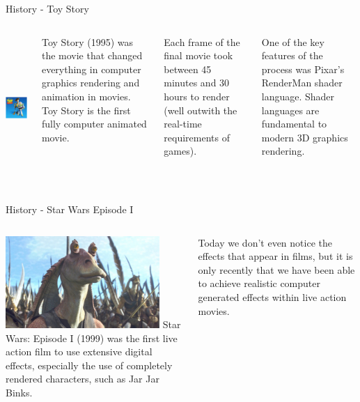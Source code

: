 \documentclass[handout,18pt]{beamer}
\begin{document}
\begin{frame}{History - Toy Story}
\begin{columns}
\includegraphics[height=5.5cm]{toystory.jpeg}

\vspace{10pt}
Toy Story (1995) was the movie that changed everything in computer graphics rendering and animation in movies.  Toy Story is the first fully computer animated movie.

Each frame of the final movie took between 45 minutes and 30 hours to render (well outwith the real-time requirements of games).

One of the key features of the process was Pixar's RenderMan shader language.  Shader languages are fundamental to modern 3D graphics rendering.
\end{columns}
\end{frame}

\begin{frame}{History - Star Wars Episode I}
\begin{columns}
\includegraphics[height=3.5cm]{jarjar.jpg}
Star Wars: Episode I (1999) was the first live action film to use extensive digital effects, especially the use of completely rendered characters, such as Jar Jar Binks.

\vspace{11pt}
Today we don't even notice the effects that appear in films, but it is only recently that we have been able to achieve realistic computer generated effects within live action movies.
\end{columns}
\end{frame}
\end{document}
